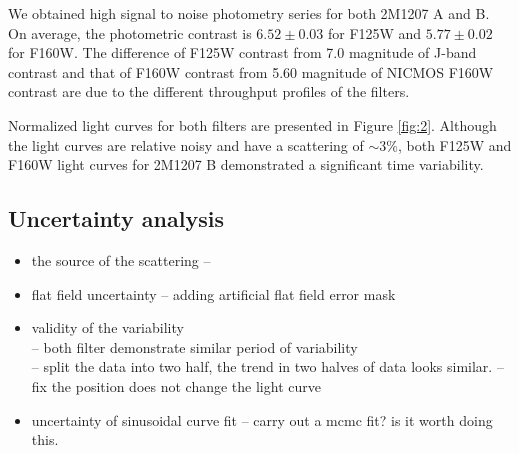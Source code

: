 \documentclass[apj]{emulateapj}
\begin{document}
We obtained high signal to noise photometry series for both 2M1207 A
and B. On average, the photometric contrast is $6.52\pm0.03$ for
F125W and $5.77\pm0.02$ for F160W. The difference of F125W contrast
from 7.0 magnitude of J-band contrast \citep{Mohanty2007} and that of
F160W contrast from 5.60 magnitude of NICMOS F160W contrast
\citep{Song2006} are due to the different throughput profiles of the
filters.

Normalized light curves for both filters are presented in Figure
\ref{fig:2}. Although the light curves are relative noisy and have a
scattering of $\sim 3\%$, both F125W and F160W light curves for 2M1207
B demonstrated a significant time variability.
\begin{figure*}[h]
  \centering
  \caption{Normalized F125W and F160W light curves for 2M1207 B and
    A. For companion's light curves, gray crosses are unbinned
    photometric measurements while red circles and blue squares are
    exposure-set-based binned data representing two halves of the data
  set. For F160W, green curve is least square fitted sinusoidal wave
  with period fixed to be same as the fitting result for F125W, and
  purple curve is the one with no parameter fixed in the fitting routine.}
  \label{fig:2}
\end{figure*}

\subsection{Uncertainty analysis}
\begin{itemize}
\item the source of the scattering -- 
\item flat field uncertainty -- adding artificial flat field error mask
\item validity of the variability\\
  -- both filter demonstrate similar period of variability\\
  -- split the data into two half, the trend in two halves of data
  looks similar.
  -- fix the position does not change the light curve
\item uncertainty of sinusoidal curve fit
  -- carry out a mcmc fit? is it worth doing this.
\end{itemize}

\begin{figure*}[h]
  \centering
  \caption{Fluxes of the primary and the secondary is correlated with
    the ditheirng positions. Different symbols represent different
    orbits.}
  \label{fig:3}
\end{figure*}
\end{document}

